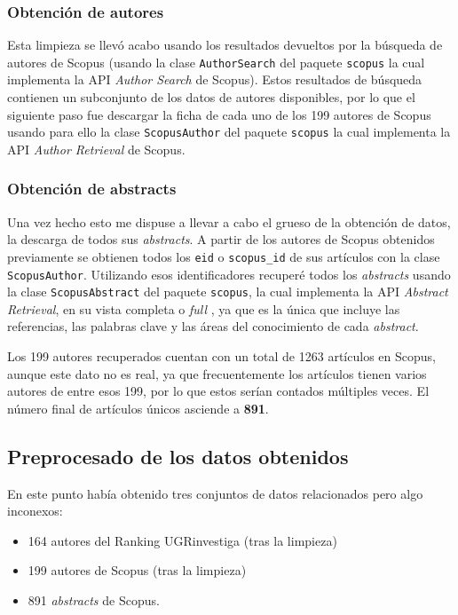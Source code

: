 \subsubsection{Obtención de autores}
Esta limpieza se llevó acabo usando los resultados devueltos por la búsqueda de autores de Scopus (usando la clase \texttt{AuthorSearch} del paquete \texttt{scopus} la cual implementa la \acrshort{API} \textit{Author Search} de Scopus). Estos resultados de búsqueda contienen un subconjunto de los datos de autores disponibles, por lo que el siguiente paso fue descargar la ficha de cada uno de los 199 autores de Scopus usando para ello la clase \texttt{ScopusAuthor} del paquete \texttt{scopus} la cual implementa la \acrshort{API} \textit{Author Retrieval} de Scopus.

\subsubsection{Obtención de abstracts}
Una vez hecho esto me dispuse a llevar a cabo el grueso de la obtención de datos, la descarga de todos sus \textit{abstracts}. A partir de los autores de Scopus obtenidos previamente se obtienen todos los \texttt{eid} o \texttt{scopus\_id} de sus artículos con la clase \texttt{ScopusAuthor}. Utilizando esos identificadores recuperé todos los \textit{abstracts} usando la clase \texttt{ScopusAbstract} del paquete \texttt{scopus}, la cual implementa la \acrshort{API} \textit{Abstract Retrieval}, en su vista completa o \textit{full} \cite{scopusAbstractViews}, ya que es la única que incluye las referencias, las palabras clave y las áreas del conocimiento de cada \textit{abstract}.

Los 199 autores recuperados cuentan con un total de 1263 artículos en Scopus, aunque este dato no es real, ya que frecuentemente los artículos tienen varios autores de entre esos 199, por lo que estos serían contados múltiples veces. El número final de artículos únicos asciende a \textbf{891}.

\subsection{Preprocesado de los datos obtenidos}
En este punto había obtenido tres conjuntos de datos relacionados pero algo inconexos:
\begin{itemize}
	\item 164 autores del Ranking UGRinvestiga (tras la limpieza)
	\item 199 autores de Scopus (tras la limpieza)
	\item 891 \textit{abstracts} de Scopus. 
\end{itemize}

